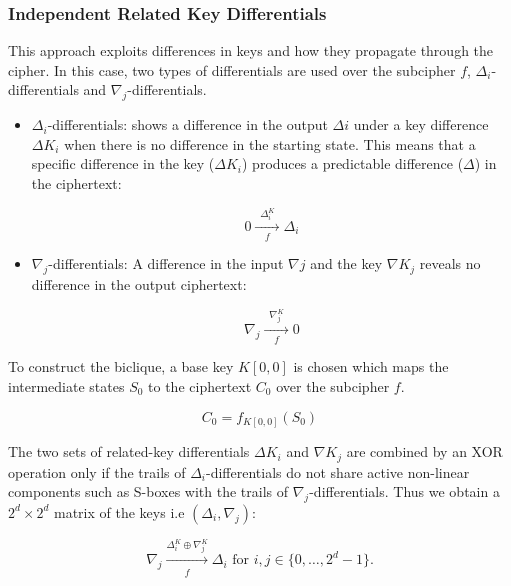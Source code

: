 \documentclass{report}
\begin{document}
\subsubsection{Independent Related Key Differentials}
This approach exploits differences in keys and how they propagate through the cipher. In this case, two types of differentials are used over the subcipher $f$, $\Delta_i$-differentials and $\nabla_j$-differentials.

\begin{itemize}
    \item $\Delta_i$-differentials: shows a difference in the output $\Delta i$ under a key difference $\Delta K_i$ when there is no difference in the starting state. This means that a specific difference in the key ($\Delta K_i$) produces a predictable difference ($\Delta$) in the ciphertext:
    
    \begin{equation}
        0 \xrightarrow[\quad f \quad]{\Delta^K_i} \Delta_i
    \end{equation}

    \item $\nabla_j$-differentials: A difference in the input $\nabla j$ and the key $\nabla K_j$ reveals no difference in the output ciphertext:

    \begin{equation}
        \nabla_j \xrightarrow[\quad f \quad]{\nabla^K_j} 0
    \end{equation}

\end{itemize}

To construct the biclique, a base key \( K[0,0] \) is chosen which maps the intermediate states \( S_0 \) to the ciphertext \( C_0 \) over the subcipher \( f \).

 \begin{equation}
    C_0 = f_{K[0,0]}(S_0) 
 \end{equation}

 The two sets of related-key differentials \( \Delta K_i \) and \( \nabla K_j \) are combined by an XOR operation only if the trails of \( \Delta_i \)-differentials do not share active non-linear components such as S-boxes with the trails of \( \nabla_j \)-differentials. Thus we obtain a \( 2^d \times 2^d \) matrix of the keys i.e \( (\Delta_i, \nabla_j) \):

\begin{equation}    
     \nabla_j \xrightarrow[\substack{f }]{\Delta_i^K \oplus \nabla_j^K} \Delta_i \text{ for } i, j \in \{0, \ldots, 2^d - 1\}.
\end{equation}
\end{document}
